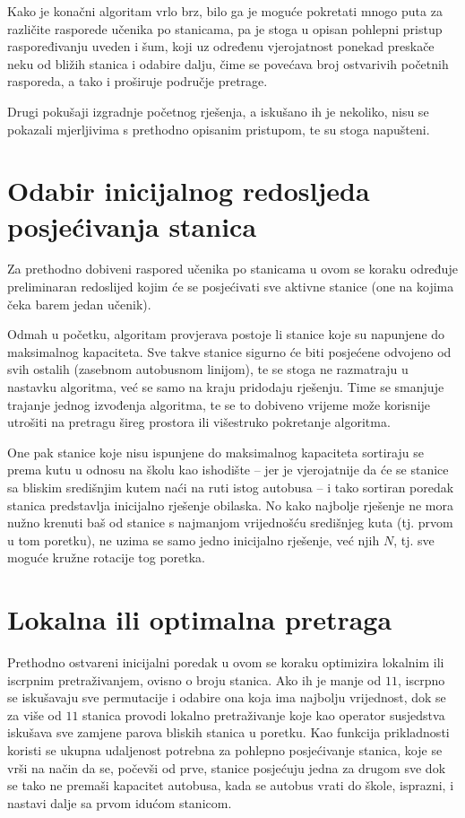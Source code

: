 \documentclass[times, utf8, seminar, numeric]{fer}
\begin{document}
Kako je konačni algoritam vrlo brz, bilo ga je moguće pokretati mnogo puta za različite rasporede učenika po stanicama, pa je stoga u opisan pohlepni pristup raspoređivanju uveden i šum, koji uz određenu vjerojatnost ponekad preskače neku od bližih stanica i odabire dalju, čime se povećava broj ostvarivih početnih rasporeda, a tako i proširuje područje pretrage.

Drugi pokušaji izgradnje početnog rješenja, a iskušano ih je nekoliko, nisu se pokazali mjerljivima s prethodno opisanim pristupom, te su stoga napušteni.

\section{Odabir inicijalnog redosljeda posjećivanja stanica}
Za prethodno dobiveni raspored učenika po stanicama u ovom se koraku određuje preliminaran redoslijed kojim će se posjećivati sve aktivne stanice (one na kojima čeka barem jedan učenik).

Odmah u početku, algoritam provjerava postoje li stanice koje su napunjene do maksimalnog kapaciteta. Sve takve stanice sigurno će biti posjećene odvojeno od svih ostalih (zasebnom autobusnom linijom), te se stoga ne razmatraju u nastavku algoritma, već se samo na kraju pridodaju rješenju. Time se smanjuje trajanje jednog izvođenja algoritma, te se to dobiveno vrijeme može korisnije utrošiti na pretragu šireg prostora ili višestruko pokretanje algoritma.

One pak stanice koje nisu ispunjene do maksimalnog kapaciteta sortiraju se prema kutu u odnosu na školu kao ishodište -- jer je vjerojatnije da će se stanice sa bliskim središnjim kutem naći na ruti istog autobusa -- i tako sortiran poredak stanica predstavlja inicijalno rješenje obilaska. No kako najbolje rješenje ne mora nužno krenuti baš od stanice s najmanjom vrijednošću središnjeg kuta (tj. prvom u tom poretku), ne uzima se samo jedno inicijalno rješenje, već njih $N$, tj. sve moguće kružne rotacije tog poretka.

\section{Lokalna ili optimalna pretraga}
Prethodno ostvareni inicijalni poredak u ovom se koraku optimizira lokalnim ili iscrpnim pretraživanjem, ovisno o broju stanica. Ako ih je manje od $11$, iscrpno se iskušavaju sve permutacije i odabire ona koja ima najbolju vrijednost, dok se za više od $11$ stanica provodi lokalno pretraživanje koje kao operator susjedstva iskušava sve zamjene parova bliskih stanica u poretku. Kao funkcija prikladnosti koristi se ukupna udaljenost potrebna za pohlepno posjećivanje stanica, koje se vrši na način da se, počevši od prve, stanice posjećuju jedna za drugom sve dok se tako ne premaši kapacitet autobusa, kada se autobus vrati do škole, isprazni, i nastavi dalje sa prvom idućom stanicom.
\end{document}
